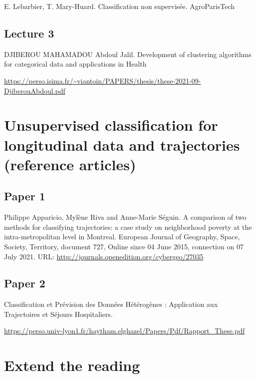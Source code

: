 \documentclass[
]{book}
\begin{document}
E. Lebarbier, T. Mary-Huard. Classification non supervisée. AgroParisTech

\hypertarget{lecture-3}{%
\section{Lecture 3}\label{lecture-3}}

DJIBEROU MAHAMADOU Abdoul Jalil. Development of clustering algorithms for categorical data and applications
in Health

\url{https://perso.isima.fr/~viantoin/PAPERS/thesis/these-2021-09-DjiberouAbdoul.pdf}

\hypertarget{unsupervised-classification-for-longitudinal-data-and-trajectories-reference-articles}{%
\chapter{Unsupervised classification for longitudinal data and trajectories (reference articles)}\label{unsupervised-classification-for-longitudinal-data-and-trajectories-reference-articles}}

\hypertarget{paper-1}{%
\section{Paper 1}\label{paper-1}}

Philippe Apparicio, Mylène Riva and Anne-Marie Séguin. A comparison of two
methods for classifying trajectories: a case study on neighborhood poverty at the intra-metropolitan level in Montreal. European Journal of Geography, Space, Society, Territory, document 727, Online since 04 June 2015, connection on 07 July 2021.
URL: \url{http://journals.openedition.org/cybergeo/27035}

\hypertarget{paper-2}{%
\section{Paper 2}\label{paper-2}}

Classification et Prévision des Données Hétérogènes : Application aux Trajectoires et Séjours Hospitaliers.

\url{https://perso.univ-lyon1.fr/haytham.elghazel/Papers/Pdf/Rapport_These.pdf}

\hypertarget{extend-the-reading}{%
\chapter{Extend the reading}\label{extend-the-reading}}

  
\end{document}
